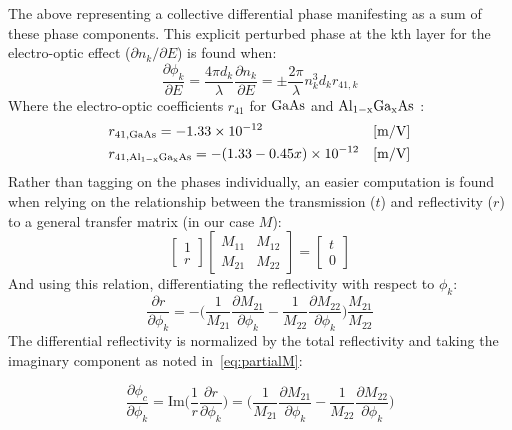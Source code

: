 \noindent The above representing a collective differential phase manifesting as a sum of these phase components. This explicit perturbed phase at the kth layer for the electro-optic effect ($\partial n_k/\partial E$) is found when:
\begin{equation}\label{eq:EOphasekdiff}
	\frac{\partial \phi_k}{\partial E} = \frac{4 \pi d_k}{\lambda} \frac{\partial n_k}{\partial E} = \pm \frac{ 2 \pi}{\lambda} n_k^3 d_k r_{41,k}
\end{equation}
\noindent Where the electro-optic coefficients $r_{41}$ for $\mathrm{GaAs}$ and $\mathrm{Al_{1-x}Ga_{x}As}$ \cite{suzuki:1984, adachi:2012, adachi:1985}:
\begin{equation}
\begin{aligned}
	& r_{41, \mathrm{GaAs}} =  -1.33 \times 10^{-12} & [\mathrm{m} / \mathrm{V}]
	\\ 
	& r_{41, \mathrm{Al_{1-x}Ga_{x}As}}  = - (1.33 - 0.45x) \times 10^{-12} &  [\mathrm{m}/\mathrm{V}]
\end{aligned}
\end{equation}
\noindent Rather than tagging on the phases individually, an easier computation is found when relying on the relationship between the transmission ($t$) and reflectivity ($r$) to a general transfer matrix (in our case $M$):
$$
	\begin{bmatrix} 1 \\ r \end{bmatrix} \begin{bmatrix} M_{11} & M_{12} \\ M_{21} & M_{22} \end{bmatrix} = \begin{bmatrix} t \\ 0\end{bmatrix}
$$
\noindent And using this relation, differentiating the reflectivity with respect to $\phi_k$:
$$
	\frac{\partial r}{\partial \phi_k} = - \bigg( \frac{1}{M_{21}} \frac{\partial M_{21}}{\partial \phi_k} - \frac{1}{M_{22}}\frac{\partial M_{22}}{\partial \phi_k} \bigg) \frac{M_{21}}{M_{22}}
$$
\noindent The differential reflectivity is normalized by the total reflectivity and taking the imaginary component as noted in~\autoref{eq:partialM}: 

\begin{equation}
	\frac{\partial \phi_c}{\partial \phi_k}  = \mathrm{Im} \bigg(\frac{1}{r} \frac{\partial r}{\partial \phi_k} \bigg) =  \bigg( \frac{1}{M_{21}} \frac{\partial M_{21}}{\partial \phi_k} - \frac{1}{M_{22}}\frac{\partial M_{22}}{\partial \phi_k} \bigg) 
\end{equation}

